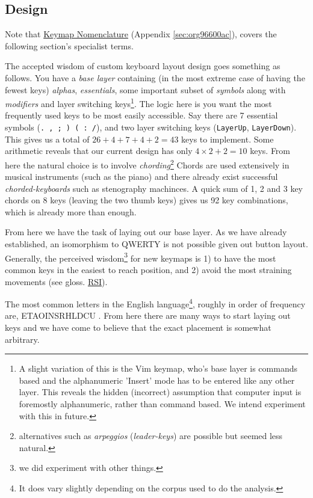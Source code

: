 \documentclass[logo,bsc,singlespacing,parskip]{infthesis}
\begin{document}
\subsection{Design}
\label{sec:org812cd0d}
Note that \hyperref[sec:org96600ac]{Keymap Nomenclature} (Appendix \ref{sec:org96600ac}), covers the following section's specialist terms.

The accepted wisdom of custom keyboard layout design goes something as follows.
You have a \emph{base layer} containing (in the most extreme case of having the fewest keys) \emph{alphas}, \emph{essentials}, some important subset of \emph{symbols} along with \emph{modifiers} and layer switching keys\footnote{A slight variation of this is the Vim \autocite{WelcomeHomeVim} keymap, who's base layer is commands based and the alphanumeric 'Insert' mode has to be entered like any other layer. This reveals the hidden (incorrect) assumption that computer input is foremostly alphanumeric, rather than command based. We intend experiment with this in future.}.
The logic here is you want the most frequently used keys to be most easily accessible.
Say there are 7 essential symbols (\texttt{. , ; ) ( : /}), and two layer switching keys (\texttt{LayerUp}, \texttt{LayerDown}).
This gives us a total of \(26+4+7+4+2=43\) keys to implement.
Some arithmetic reveals that our current design has only \(4\times2 + 2 = 10\) keys.
From here the natural choice is to involve \emph{chording}\footnote{alternatives such as \emph{arpeggios} (\emph{leader-keys}) are possible but seemed less natural.}
Chords are used extensively in musical instruments (such as the piano) and there already exist successful \emph{chorded-keyboards} such as stenography machinces.
A quick sum of 1, 2 and 3 key chords on 8 keys (leaving the two thumb keys) gives us 92 key combinations, which is already more than enough.

From here we have the task of laying out our base layer.
As we have already established, an isomorphism to QWERTY is not possible given out button layout.
Generally, the perceived wisdom\footnote{we did experiment with other things.} for new keymaps is 1) to have the most common keys in the easiest to reach position, and 2) avoid the most straining movements (see gloss. \hyperref[orgc186d45]{RSI}).

The most common letters in the English language\footnote{It does vary slightly depending on the corpus used to do the analysis.}, roughly in order of frequency are, ETAOINSRHLDCU \autocite{norvigEnglishLetterFrequency}.
From here there are many ways to start laying out keys and we have come to believe that the exact placement is somewhat arbitrary.
\end{document}
